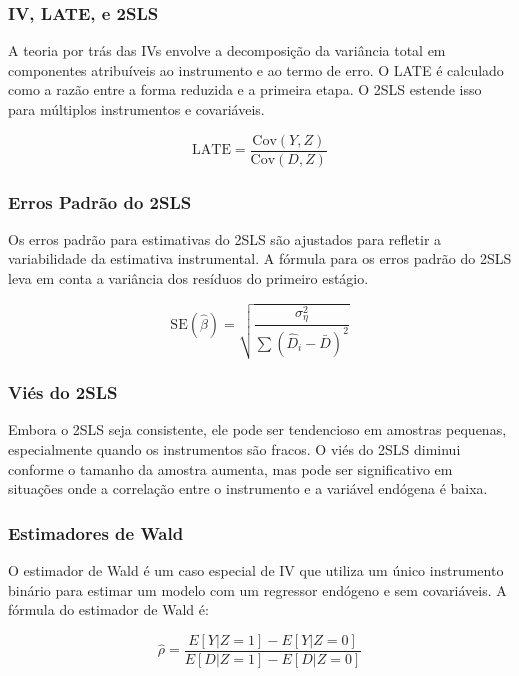 \documentclass[a4paper,12pt]{article}[abntex2]
\begin{document}
\subsubsection*{IV, LATE, e 2SLS}

A teoria por trás das IVs envolve a decomposição da variância total em componentes atribuíveis ao instrumento e ao termo de erro. O LATE é calculado como a razão entre a forma reduzida e a primeira etapa. O 2SLS estende isso para múltiplos instrumentos e covariáveis.

\begin{equation}
    \text{LATE} = \frac{\text{Cov}(Y, Z)}{\text{Cov}(D, Z)}
\end{equation}

\subsubsection*{Erros Padrão do 2SLS}

Os erros padrão para estimativas do 2SLS são ajustados para refletir a variabilidade da estimativa instrumental. A fórmula para os erros padrão do 2SLS leva em conta a variância dos resíduos do primeiro estágio.

\begin{equation}
    \text{SE}(\hat{\beta}) = \sqrt{\frac{\sigma_\eta^2}{\sum (\hat{D}_i - \bar{D})^2}}
\end{equation}

\subsubsection*{Viés do 2SLS}

Embora o 2SLS seja consistente, ele pode ser tendencioso em amostras pequenas, especialmente quando os instrumentos são fracos. O viés do 2SLS diminui conforme o tamanho da amostra aumenta, mas pode ser significativo em situações onde a correlação entre o instrumento e a variável endógena é baixa.

\subsubsection*{Estimadores de Wald}

O estimador de Wald é um caso especial de IV que utiliza um único instrumento binário para estimar um modelo com um regressor endógeno e sem covariáveis. A fórmula do estimador de Wald é:

\begin{equation}
    \hat{\rho} = \frac{E[Y|Z=1] - E[Y|Z=0]}{E[D|Z=1] - E[D|Z=0]}
\end{equation}
\end{document}
